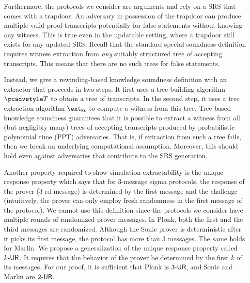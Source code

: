 Furthermore, the protocols we consider are arguments and rely on a SRS that comes with a trapdoor. An adversary in
possession of the trapdoor can produce multiple valid proof transcripts potentially for false statements without
knowing any witness. This is true even in
the updatable setting, where a trapdoor still exists for any updated SRS. Recall
that the standard special soundness definition requires witness extraction from
\emph{any} suitably structured tree of accepting transcripts. This means
that there are no such trees for false statements. 

Instead, we give a rewinding-based knowledge soundness definition with an extractor that proceeds in two steps. It first uses a tree building algorithm $\tdv$ to obtain a tree of transcripts. In the second step, it uses a tree extraction algorithm $\extcss$ to compute a witness from this tree. Tree-based knowledge soundness guarantees that it is possible to extract a witness from all
(but negligibly many) trees of accepting transcripts produced by probabilistic
polynomial time (PPT) adversaries. That
is, if extraction from such a tree fails, then we break an underlying
computational assumption. Moreover, this should hold even against adversaries
that contribute to the SRS generation.

  Another property
required to show simulation extractability is the unique response property which says
that for $3$-message sigma protocols, the response of the prover ($3$-rd message) is determined by the first message and the challenge~\cite{C:Fischlin05} (intuitively, the prover can only employ fresh randomness in the first
message of the protocol). We cannot use this definition since the protocols
we consider have multiple rounds of randomized prover messages. In
Plonk, both the first and the third messages are randomized. Although the Sonic prover
is deterministic after it picks its first message, the protocol has more than $3$
messages. The same holds for Marlin. We propose a generalization of the unique response property called ${k\text{-}\mathsf{UR}}$. It requires that the behavior of the prover be determined by the first
$k$ of its messages. For our proof, it is sufficient that Plonk is ${3\text{-}\mathsf{UR}}$, and Sonic and Marlin are ${2\text{-}\mathsf{UR}}$.


